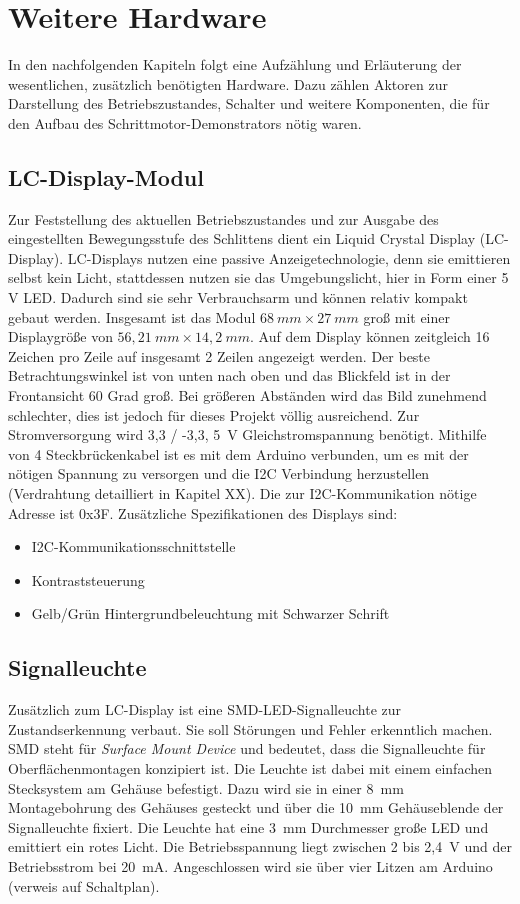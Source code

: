 
\chapter{Weitere Hardware}
In den nachfolgenden Kapiteln folgt eine Aufzählung und Erläuterung der wesentlichen, zusätzlich benötigten Hardware. Dazu zählen Aktoren zur Darstellung des Betriebszustandes, Schalter und weitere Komponenten, die für den Aufbau des Schrittmotor-Demonstrators nötig waren.  

\section{LC-Display-Modul}
Zur Feststellung des aktuellen Betriebszustandes und zur Ausgabe des eingestellten Bewegungsstufe des Schlittens dient ein Liquid Crystal Display (LC-Display). LC-Displays nutzen eine passive Anzeigetechnologie, denn sie emittieren selbst kein Licht, stattdessen nutzen sie das Umgebungslicht, hier in Form einer 5 V LED. Dadurch sind sie sehr Verbrauchsarm und können relativ kompakt gebaut werden.\cite{HTech.2015} Insgesamt ist das Modul $68 \ mm \times 27  \ mm$ groß mit einer Displaygröße von $56,21 \ mm \times 14,2 \ mm$. Auf dem Display können zeitgleich 16 Zeichen pro Zeile auf insgesamt 2 Zeilen angezeigt werden. Der beste Betrachtungswinkel ist von unten nach oben und das Blickfeld ist in der Frontansicht 60 Grad groß. Bei größeren Abständen wird das Bild zunehmend schlechter, dies ist jedoch für dieses Projekt völlig ausreichend. Zur Stromversorgung wird  3,3 / -3,3, 5\ V Gleichstromspannung benötigt. Mithilfe von 4 Steckbrückenkabel ist es mit dem Arduino verbunden, um es mit der nötigen Spannung zu versorgen und die I2C Verbindung herzustellen (Verdrahtung detailliert in Kapitel XX). Die zur I2C-Kommunikation nötige Adresse ist 0x3F. %
Zusätzliche Spezifikationen des Displays sind: 
	\begin{itemize}
		\item I2C-Kommunikationsschnittstelle 
		\item Kontraststeuerung
		\item Gelb/Grün Hintergrundbeleuchtung mit Schwarzer Schrift
	\end{itemize}
\cite{WaveShare.2007}

\section{Signalleuchte}
Zusätzlich zum LC-Display ist eine SMD-LED-Signalleuchte zur Zustandserkennung verbaut. Sie soll Störungen und Fehler erkenntlich machen. SMD steht für \emph{Surface Mount Device} und bedeutet, dass die Signalleuchte für Oberflächenmontagen konzipiert ist. Die Leuchte ist dabei mit einem einfachen Stecksystem am Gehäuse befestigt. Dazu wird sie in einer 8\ mm Montagebohrung des Gehäuses gesteckt und über die 10\ mm Gehäuseblende der Signalleuchte fixiert. Die Leuchte hat eine 3\ mm Durchmesser große LED und emittiert ein rotes Licht. Die Betriebsspannung liegt zwischen 2 bis 2,4\ V und der Betriebsstrom bei 20\ mA. Angeschlossen wird sie über vier Litzen am Arduino (verweis auf Schaltplan).\cite{Mentor.2024}

